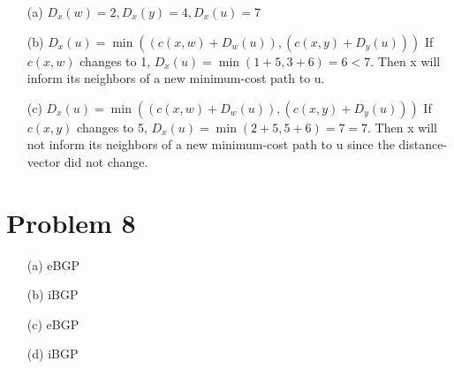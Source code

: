 \documentclass[12pt,a4paper]{article}
\begin{document}
\begin{enumerate}
    \item [(a)] 
        $D_{x}(w) = 2, D_{x}(y) = 4, D_{x}(u) = 7$
    \item[(b)]
        $D_{x}(u) = \min((c(x,w) + D_{w}(u)), (c(x,y) + D_{y}(u)))$ If $c(x,w)$ changes to 1, $D_{x}(u) = \min(1+5, 3+6) = 6 < 7$.
        Then x will inform its neighbors of a new minimum-cost path to u.
    \item[(c)]
        $D_{x}(u) = \min((c(x,w) + D_{w}(u)), (c(x,y) + D_{y}(u)))$ If $c(x,y)$ changes to 5, $D_{x}(u) = \min(2+5, 5+6) = 7 = 7$.
        Then x will not inform its neighbors of a new minimum-cost path to u since the distance-vector did not change.
        
\end{enumerate}

\newpage

\section*{Problem 8}

\begin{enumerate}
    \item [(a)] 
        eBGP
    \item[(b)]
        iBGP
    \item[(c)]
        eBGP
    \item[(d)]
        iBGP

\end{enumerate}
\end{document}
